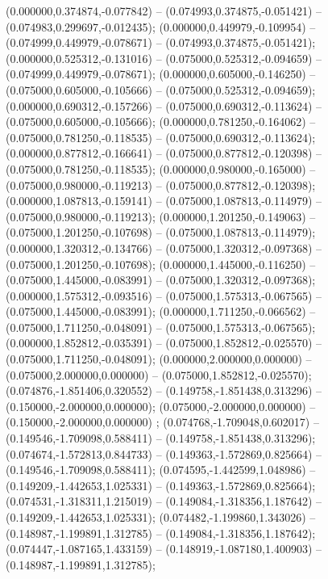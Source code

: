  (0.000000,0.374874,-0.077842) -- (0.074993,0.374875,-0.051421) -- (0.074983,0.299697,-0.012435);
 (0.000000,0.449979,-0.109954) -- (0.074999,0.449979,-0.078671) -- (0.074993,0.374875,-0.051421);
 (0.000000,0.525312,-0.131016) -- (0.075000,0.525312,-0.094659) -- (0.074999,0.449979,-0.078671);
 (0.000000,0.605000,-0.146250) -- (0.075000,0.605000,-0.105666) -- (0.075000,0.525312,-0.094659);
 (0.000000,0.690312,-0.157266) -- (0.075000,0.690312,-0.113624) -- (0.075000,0.605000,-0.105666);
 (0.000000,0.781250,-0.164062) -- (0.075000,0.781250,-0.118535) -- (0.075000,0.690312,-0.113624);
 (0.000000,0.877812,-0.166641) -- (0.075000,0.877812,-0.120398) -- (0.075000,0.781250,-0.118535);
 (0.000000,0.980000,-0.165000) -- (0.075000,0.980000,-0.119213) -- (0.075000,0.877812,-0.120398);
 (0.000000,1.087813,-0.159141) -- (0.075000,1.087813,-0.114979) -- (0.075000,0.980000,-0.119213);
 (0.000000,1.201250,-0.149063) -- (0.075000,1.201250,-0.107698) -- (0.075000,1.087813,-0.114979);
 (0.000000,1.320312,-0.134766) -- (0.075000,1.320312,-0.097368) -- (0.075000,1.201250,-0.107698);
 (0.000000,1.445000,-0.116250) -- (0.075000,1.445000,-0.083991) -- (0.075000,1.320312,-0.097368);
 (0.000000,1.575312,-0.093516) -- (0.075000,1.575313,-0.067565) -- (0.075000,1.445000,-0.083991);
 (0.000000,1.711250,-0.066562) -- (0.075000,1.711250,-0.048091) -- (0.075000,1.575313,-0.067565);
 (0.000000,1.852812,-0.035391) -- (0.075000,1.852812,-0.025570) -- (0.075000,1.711250,-0.048091);
 (0.000000,2.000000,0.000000) -- (0.075000,2.000000,0.000000) -- (0.075000,1.852812,-0.025570);
 (0.074876,-1.851406,0.320552) -- (0.149758,-1.851438,0.313296) -- (0.150000,-2.000000,0.000000);
 (0.075000,-2.000000,0.000000) -- (0.150000,-2.000000,0.000000) ;
 (0.074768,-1.709048,0.602017) -- (0.149546,-1.709098,0.588411) -- (0.149758,-1.851438,0.313296);
 (0.074674,-1.572813,0.844733) -- (0.149363,-1.572869,0.825664) -- (0.149546,-1.709098,0.588411);
 (0.074595,-1.442599,1.048986) -- (0.149209,-1.442653,1.025331) -- (0.149363,-1.572869,0.825664);
 (0.074531,-1.318311,1.215019) -- (0.149084,-1.318356,1.187642) -- (0.149209,-1.442653,1.025331);
 (0.074482,-1.199860,1.343026) -- (0.148987,-1.199891,1.312785) -- (0.149084,-1.318356,1.187642);
 (0.074447,-1.087165,1.433159) -- (0.148919,-1.087180,1.400903) -- (0.148987,-1.199891,1.312785);
